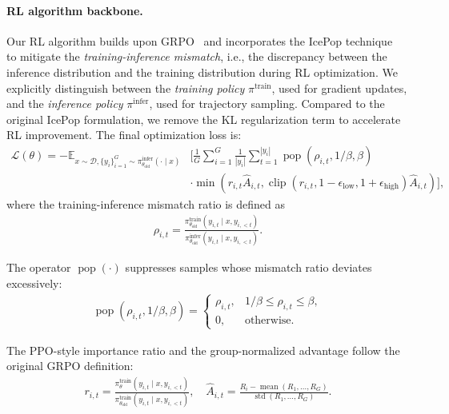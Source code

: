 \documentclass{article}
\theoremstyle{definition}
\begin{document}
\paragraph{RL algorithm backbone.}
Our RL algorithm builds upon GRPO~\cite{shao2024deepseekmath} and incorporates the IcePop technique~\cite{IcePop2025} to mitigate the \emph{training-inference mismatch}, i.e., the discrepancy between the inference distribution and the training distribution during RL optimization. We explicitly distinguish between the \emph{training policy} $\pi^{\text{train}}$, used for gradient updates, and the \emph{inference policy} $\pi^{\text{infer}}$, used for trajectory sampling. Compared to the original IcePop formulation, we remove the KL regularization term to accelerate RL improvement.
The final optimization loss is:
\begin{equation}
\begin{aligned}
\mathcal{L}(\theta)=
-\mathbb{E}_{
x \sim \mathcal{D},
\{y_i\}_{i=1}^{G} \sim \pi^{\text{infer}}_{\theta_{\text{old}}}(\cdot \mid x)
}
&\Bigg[
\frac{1}{G}
\sum_{i=1}^{G}
\frac{1}{|y_i|}
\sum_{t=1}^{|y_i|}
\operatorname{pop}
(\rho_{i,t}, 1/\beta, \beta) \\
&\cdot
\min\!\left(
r_{i,t}\hat{A}_{i,t},
\operatorname{clip}\!\left(
r_{i,t},
1-\epsilon_{\text{low}},
1+\epsilon_{\text{high}}
\right)
\hat{A}_{i,t}
\right)
\Bigg],
\label{icepop}
\end{aligned}
\end{equation}
where the training-inference mismatch ratio is defined as
\begin{align*}
\rho_{i,t}
=
\frac{
\pi_{\theta_{\text{old}}}^{\text{train}}(y_{i,t} \mid x, y_{i,<t})
}{
\pi_{\theta_{\text{old}}}^{\text{infer}}(y_{i,t} \mid x, y_{i,<t})
}.
\end{align*}

The operator $\operatorname{pop}(\cdot)$ suppresses samples whose mismatch ratio deviates excessively:
\begin{align*}
\operatorname{pop}(\rho_{i,t}, 1/\beta, \beta)
=
\begin{cases}
\rho_{i,t}, & 1/\beta \le \rho_{i,t} \le \beta, \\
0, & \text{otherwise}.
\end{cases}
\end{align*}

The PPO-style importance ratio and the group-normalized advantage follow the original GRPO definition:
\begin{align*}
r_{i,t}
=
\frac{
\pi_\theta^{\text{train}}(y_{i,t}\mid x,y_{i,<t})
}{
\pi_{\theta_{\text{old}}}^{\text{train}}(y_{i,t}\mid x,y_{i,<t})
},
\quad
\hat{A}_{i,t}
=
\frac{
R_i - \operatorname{mean}(R_1,\dots,R_G)
}{
\operatorname{std}(R_1,\dots,R_G)
}.
\end{align*}
\end{document}
